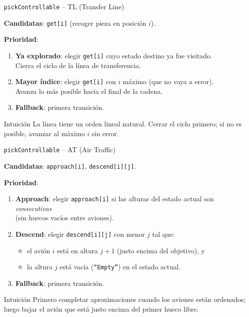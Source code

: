 \documentclass{beamer}
\begin{document}
\begin{frame}{\texttt{pickControllable} -- TL (Transfer Line)}

\textbf{Candidatas}: \texttt{get[i]} (recoger pieza en posici\'on $i$).

\bigskip
\textbf{Prioridad}:
\begin{enumerate}
  \item \textbf{Ya explorado}: elegir \texttt{get[i]} cuyo estado destino ya fue visitado.\\
    {\small Cierra el ciclo de la l\'inea de transferencia.}
  \item \textbf{Mayor \'indice}: elegir \texttt{get[i]} con $i$ m\'aximo (que no vaya a error).\\
    {\small Avanza lo m\'as posible hacia el final de la cadena.}
  \item \textbf{Fallback}: primera transici\'on.
\end{enumerate}

\bigskip
\begin{block}{Intuici\'on}
La l\'inea tiene un orden lineal natural. Cerrar el ciclo primero; si no es posible, avanzar al m\'aximo $i$ sin error.
\end{block}
\end{frame}

\begin{frame}{\texttt{pickControllable} -- AT (Air Traffic)}

\textbf{Candidatas}: \texttt{approach[i]}, \texttt{descend[i][j]}.

\bigskip
\textbf{Prioridad}:
\begin{enumerate}
  \item \textbf{Approach}: elegir \texttt{approach[i]} si las alturas del estado actual son \emph{consecutivas}\\
    (sin huecos vac\'ios entre aviones).
  \item \textbf{Descend}: elegir \texttt{descend[i][j]} con menor $j$ tal que:
    \begin{itemize}
      \item el avi\'on $i$ est\'a en altura $j{+}1$ (justo encima del objetivo), y
      \item la altura $j$ est\'a vac\'ia (\texttt{``Empty''}) en el estado actual.
    \end{itemize}
  \item \textbf{Fallback}: primera transici\'on.
\end{enumerate}

\bigskip
\begin{block}{Intuici\'on}
Primero completar aproximaciones cuando los aviones est\'an ordenados; luego bajar el avi\'on que est\'a justo encima del primer hueco libre.
\end{block}
\end{frame}
\end{document}
